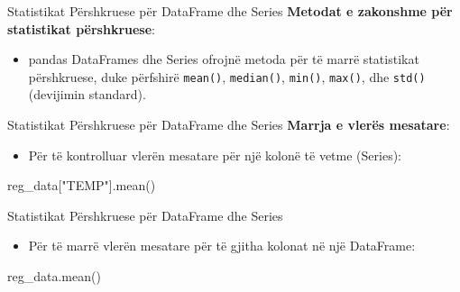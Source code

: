 \documentclass[
  ignorenonframetext,
]{beamer}
\newenvironment{Shaded}{\begin{snugshade}}{\end{snugshade}}
\newcommand{\NormalTok}[1]{#1}
\newcommand{\StringTok}[1]{\textcolor[rgb]{0.31,0.60,0.02}{#1}}
\providecommand{\tightlist}{%
  \setlength{\itemsep}{0pt}\setlength{\parskip}{0pt}}
\begin{document}
\begin{frame}[fragile]{Statistikat Përshkruese për DataFrame dhe Series}
\protect\hypertarget{statistikat-puxebrshkruese-puxebr-dataframe-dhe-series}{}
\textbf{Metodat e zakonshme për statistikat përshkruese}:

\begin{itemize}
\tightlist
\item
  pandas DataFrames dhe Series ofrojnë metoda për të marrë statistikat
  përshkruese, duke përfshirë \texttt{mean()}, \texttt{median()},
  \texttt{min()}, \texttt{max()}, dhe \texttt{std()} (devijimin
  standard).
\end{itemize}
\end{frame}

\begin{frame}[fragile]{Statistikat Përshkruese për DataFrame dhe Series}
\protect\hypertarget{statistikat-puxebrshkruese-puxebr-dataframe-dhe-series-1}{}
\textbf{Marrja e vlerës mesatare}:

\begin{itemize}
\tightlist
\item
  Për të kontrolluar vlerën mesatare për një kolonë të vetme (Series):
\end{itemize}

\begin{Shaded}
\begin{Highlighting}[]
\NormalTok{    reg\_data[}\StringTok{"TEMP"}\NormalTok{].mean()}
\end{Highlighting}
\end{Shaded}
\end{frame}

\begin{frame}[fragile]{Statistikat Përshkruese për DataFrame dhe Series}
\protect\hypertarget{statistikat-puxebrshkruese-puxebr-dataframe-dhe-series-2}{}
\begin{itemize}
\tightlist
\item
  Për të marrë vlerën mesatare për të gjitha kolonat në një DataFrame:
\end{itemize}

\begin{Shaded}
\begin{Highlighting}[]
\NormalTok{    reg\_data.mean()}
\end{Highlighting}
\end{Shaded}
\end{frame}
\end{document}
